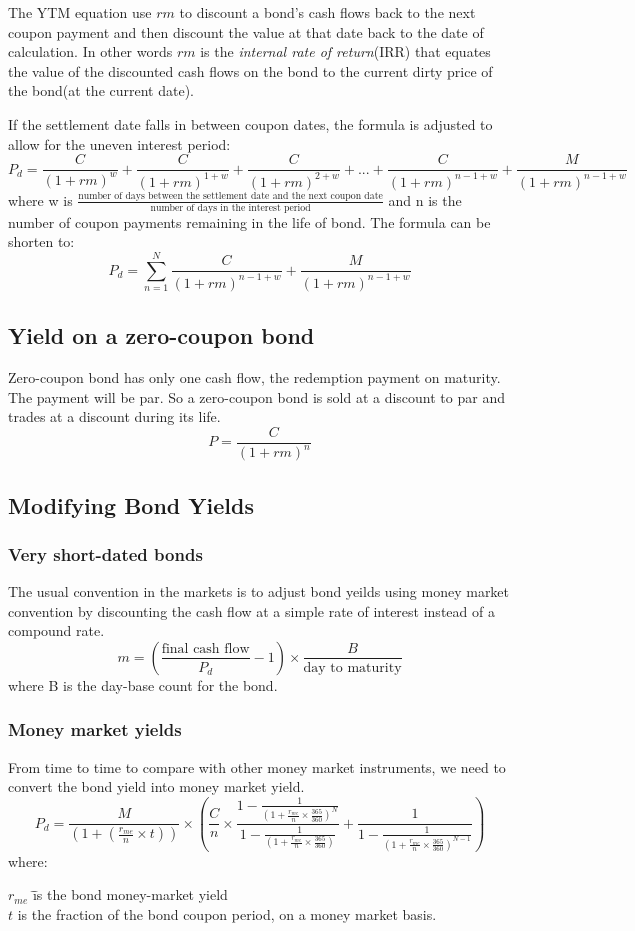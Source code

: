 \documentclass[8pt,a4paper]{article}
\begin{document}
The YTM equation use $rm$ to discount a bond's cash flows back to the next coupon payment and then discount the value at that date back to the date of calculation. In other words $rm$ is the \textit{internal rate of return}(IRR) that equates the value of the discounted cash flows on the bond to the current dirty price of the bond(at the current date).

If the settlement date falls in between coupon dates, the formula is adjusted to allow for the uneven interest period:
\[P_d=
		\frac{C}{(1+rm)^w} +
		\frac{C}{(1+rm)^{1+w}} +
		\frac{C}{(1+rm)^{2+w}} +...+
		\frac{C}{(1+rm)^{n-1+w}} +
		\frac{M}{(1+rm)^{n-1+w}}
\]
where
w is 
$\frac{\mbox{number of days between the settlement date and the next coupon date}}{\mbox{number of days in the interest period}}$
and n is the number of coupon payments remaining in the life of bond. The formula can be shorten to:
\[
P_d=\sum_{n=1}^N \frac{C}{(1+rm)^{n-1+w}} + \frac{M}{(1+rm)^{n-1+w}}
\]

\subsection{Yield on a zero-coupon bond}
Zero-coupon bond has only one cash flow, the redemption payment on maturity. The payment will be par. So a zero-coupon bond is sold at a discount to par and trades at a discount during its life.
\[
	P=\frac{C}{(1+rm)^n}
\]

\subsection{Modifying Bond Yields}
\subsubsection{Very short-dated bonds}
The usual convention in the markets is to adjust bond yeilds using money market convention by discounting the cash flow at a simple rate of interest instead of a compound rate.
\[
	m=(\frac{\mbox{final cash flow}}{P_d} - 1)\times \frac{B}{\mbox{day to maturity}}
\]
where B is the day-base count for the bond.
\subsubsection{Money market yields}
From time to time to compare with other money market instruments, we need to convert the bond yield into money market yield.
\[
	P_d=\frac{M}{(1+(\frac{r_{me}}{n}\times t))}\times(\frac{C}{n}\times \frac{1-\frac{1}{(1+\frac{r_{me}}{n}\times \frac{365}{360})^N}}{1-\frac{1}{(1+\frac{r_{me}}{n}\times \frac{365}{360})}} + \frac{1}{1-\frac{1}{(1+\frac{r_{me}}{n}\times \frac{365}{360})^{N-1}}})
\]
where:\\
\begin{tabbing}
$r_{me}$ \=\= is the bond money-market yield\\
$t$ \>\> is the fraction of the bond coupon period, on a money market basis.
\end{tabbing}
\end{document}
